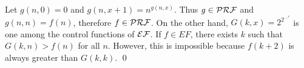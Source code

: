 
\begin{pf} \rm
 Let $g(n, 0) = 0$ and 
 $g(n, x + 1) = n^{ g(n, x)}$. Thus $g\in \mathcal{PRF}$ and $g(n, n) = f(n)$,
 therefore $f\in\mathcal{PRF}$. On the other hand, $G(k, x) = 2^{2^{\ldots^x}}$ is
 one among the control functions of $\mathcal{EF}$. If $f\in EF$, there exists
 $k$ such that $G(k, n) > f(n)$ for all $n$. However, this is impossible
 because $f(k + 2)$ is always greater than $G(k, k)$. \qed
\end{pf}



